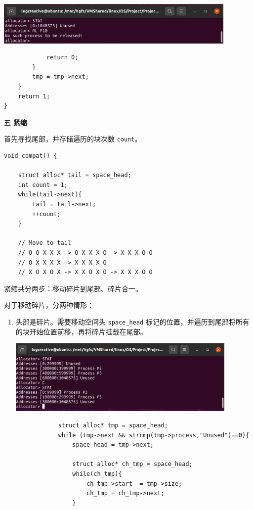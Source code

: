 \documentclass[12pt,a4paper]{article}
\newenvironment{problems}{\begin{list}{}{\renewcommand{\makelabel}[1]{\textbf{##1}\hfil}}}{\end{list}}
\begin{document}
\begin{problems}
    \includegraphics[width=0.88\textwidth]{RL22.png}
        \begin{lstlisting}
            return 0;
        }
        tmp = tmp->next;
    }
    return 1;
}
    \end{lstlisting}
    \item[五] \textbf{紧缩}
    
    首先寻找尾部，并存储遍历的块次数 \texttt{count}。
    \begin{lstlisting}
void compat() {

    struct alloc* tail = space_head;
    int count = 1;
    while(tail->next){
        tail = tail->next;
        ++count;
    }

    // Move to tail
    // O O X X X -> O X X X O -> X X X O O
    // O X X X X -> X X X X O
    // X O X O X -> X X O X O -> X X X O O

    \end{lstlisting} 

    紧缩共分两步：移动碎片到尾部、碎片合一。
    
    对于移动碎片，分两种情形：
    \begin{enumerate}
        \item 头部是碎片。需要移动空间头 \texttt{space\_head} 标记的位置，并遍历到尾部将所有的块开始位置前移，再将碎片挂载在尾部。
        
        \includegraphics[width=0.88\textwidth]{C1.png}        

        \begin{lstlisting}
            struct alloc* tmp = space_head;
            while (tmp->next && strcmp(tmp->process,"Unused")==0){
                space_head = tmp->next;
        
                struct alloc* ch_tmp = space_head;
                while(ch_tmp){
                    ch_tmp->start -= tmp->size;
                    ch_tmp = ch_tmp->next;
                }
                

\end{lstlisting}
\end{enumerate}
\end{problems}
\end{document}

